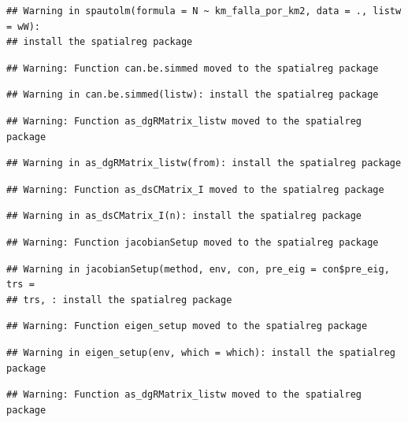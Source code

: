 \documentclass[11pt,]{article}
\begin{document}
\begin{verbatim}
## Warning in spautolm(formula = N ~ km_falla_por_km2, data = ., listw = wW):
## install the spatialreg package
\end{verbatim}

\begin{verbatim}
## Warning: Function can.be.simmed moved to the spatialreg package
\end{verbatim}

\begin{verbatim}
## Warning in can.be.simmed(listw): install the spatialreg package
\end{verbatim}

\begin{verbatim}
## Warning: Function as_dgRMatrix_listw moved to the spatialreg package
\end{verbatim}

\begin{verbatim}
## Warning in as_dgRMatrix_listw(from): install the spatialreg package
\end{verbatim}

\begin{verbatim}
## Warning: Function as_dsCMatrix_I moved to the spatialreg package
\end{verbatim}

\begin{verbatim}
## Warning in as_dsCMatrix_I(n): install the spatialreg package
\end{verbatim}

\begin{verbatim}
## Warning: Function jacobianSetup moved to the spatialreg package
\end{verbatim}

\begin{verbatim}
## Warning in jacobianSetup(method, env, con, pre_eig = con$pre_eig, trs =
## trs, : install the spatialreg package
\end{verbatim}

\begin{verbatim}
## Warning: Function eigen_setup moved to the spatialreg package
\end{verbatim}

\begin{verbatim}
## Warning in eigen_setup(env, which = which): install the spatialreg package
\end{verbatim}

\begin{verbatim}
## Warning: Function as_dgRMatrix_listw moved to the spatialreg package
\end{verbatim}
\end{document}
